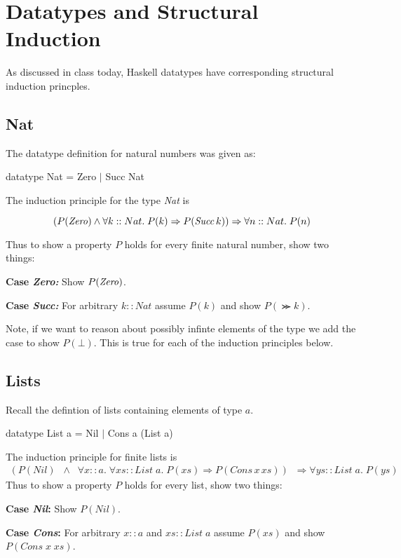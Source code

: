 \documentclass[11pt]{article}
\begin{document}


\section{Datatypes and Structural Induction}

As discussed in class today, Haskell datatypes have corresponding structural induction princples. 

\subsection{Nat}

The datatype definition for natural numbers was given as:\\

\begin{program**}
\> datatype Nat = Zero $\mid$ Succ Nat \\
\end{program**}

\goodbreak\noindent{}The induction principle for the type {\it{Nat}} is 

\[(P({\mathit{Zero}}) \wedge \forall{}k::Nat.\;P(k) \Rightarrow P({\mathit{Succ\,}}{}k)) \Rightarrow \forall{}n::Nat.\;P(n)\]

Thus to show a property $P$ holds for every finite natural number, show two things:
\begin{description}
\item{\bf{Case} \it{Zero}:}   Show $P({\mathit{Zero}})$.\vspace{-.5em}
\item{\bf{Case} \it{Succ}:}  For arbitrary $k::Nat$ assume $P(k)$ and show $P(\Succ{}k)$.
\end{description}

Note, if we want to reason about possibly infinte elements of the type we add
the case to show $P(\bot)$. This is true for each of the induction principles
below.

\subsection{Lists}

Recall the defintion of lists containing elements of type $a$.
\begin{program**}
\> datatype  List a = Nil $\mid$  Cons a (List a)
\end{program**}
The induction principle for finite lists is \[\begin{array}{l}
(P({\mathit{Nil}}) \;\;\wedge\;\; \forall{}x::a.\;\forall{}xs:: List\; a. \; P(xs) \Rightarrow P({\mathit{Cons}} \,x\,xs))  \;\; \Rightarrow \forall{}ys:: List\; a.\; P(ys)
\end{array}\]
Thus to show a property $P$ holds for every list, show two things:
\begin{description}
\item{\bf{Case} {\it{Nil}}:}  Show $P({\mathit{Nil}})$.\vspace{-.5em}
\item{\bf{Case} {\it{Cons}}:} For arbitrary $x::a$ and $xs:: List \;a$ assume $P(xs)$
and show $P({\mathit{Cons}}\;x\;xs)$.
\end{description}
\end{document}
